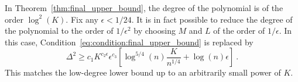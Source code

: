 \documentclass{article}
\newcommand{\alex}[1]{\textcolor{magenta}{[alex: #1]}}
\begin{document}
\medskip 

In Theorem~\ref{thm:final_upper_bound}, the degree of the polynomial is of the order $\log^{2}(K)$. Fix any $\epsilon < 1/24$. It is in fact possible to reduce the degree of the polynomial to the order of $1/\epsilon^2$ by choosing $M$ and $L$ of the order of $1/\epsilon$. In this case, Condition~\eqref{eq:condition:final_upper_bound} is replaced by 
\[
   \Delta^2 \geq c_1 K^{c_2 \epsilon} \epsilon^{c_3}\left[\log^{5/4}(n)  \frac{K}{n^{1/4}} + \log(n)\epsilon \right] \ .
\]
This matches the low-degree lower bound up to an arbitrarily small power of $K$.





\end{document}
